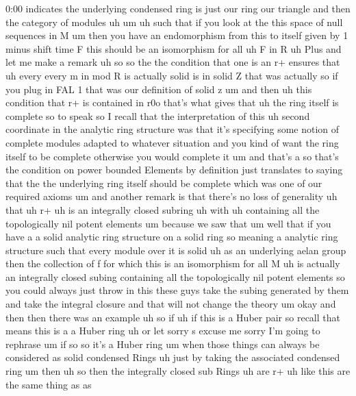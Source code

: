 \begin{unfinished}{0:00}
indicates  the  underlying  condensed  ring
is  just  our  ring  our  triangle  and  then
the  category  of
modules
uh
um  uh  such  that  if  you  look  at  the  this
space  of  null  sequences  in  M  um  then  you
have  an  endomorphism  from  this  to  itself
given  by  1  minus  shift  time  F  this
should  be  an  isomorphism  for  all  uh  F  in
R  uh
Plus
and  let  me  make  a  remark  uh
so  so  the  the  condition  that  one  is  an
r+  ensures
that  uh  every  every  m  in  mod  R  is
actually  solid  is  in  solid
Z  that  was  actually  so  if  you  plug  in
FAL  1  that  was  our  definition  of  solid  z
um  and  then  uh  this  condition  that  r+  is
contained  in  r0o  that's  what  gives  that
uh  the  ring  itself  is  complete  so  to
speak  so  I  recall  that  the
interpretation  of  this  uh  second
coordinate  in  the  analytic  ring
structure  was  that  it's  specifying  some
notion  of  complete  modules  adapted  to
whatever  situation  and  you  kind  of  want
the  ring  itself  to  be  complete  otherwise
you  would  complete  it  um  and  that's  a  so
that's  the  condition  on  power  bounded
Elements  by  definition  just  translates
to  saying  that  the  the  underlying  ring
itself  should  be  complete  which  was  one
of  our  required
axioms  um  and  another  remark  is  that
there's  no  loss  of
generality
uh  that  uh
r+  uh  is  an  integrally  closed
subring
uh  with  uh  containing  all  the
topologically  nil  potent
elements
um  because  we  saw  that
um  well  that  if  you  have  a  a  solid
analytic  ring  structure  on  a  solid  ring
so  meaning  a  analytic  ring  structure
such  that  every  module  over  it  is  solid
uh  as  an  underlying  aelan  group  then  the
collection  of  f  for  which  this  is  an
isomorphism  for  all  M  uh  is  actually  an
integrally  closed  subing  containing  all
the  topologically  nil  potent  elements  so
you  could  always  just  throw  in  this
these  guys  take  the  subing  generated  by
them  and  take  the  integral  closure  and
that  will  not  change  the
theory
um
okay  and  then  then  there  was  an  example
uh  so  if
uh  if  this  is  a  Huber
pair  so  recall  that  means  this  is  a  a
Huber
ring  uh  or  let  sorry  s  excuse  me  sorry
I'm  going  to  rephrase  um
if
so  so  it's  a  Huber  ring  um  when  those
things  can  always  be  considered  as  solid
condensed  Rings  uh  just  by  taking  the
associated  condensed  ring  um
then  uh  so  then  the  integrally
closed  sub
Rings
uh  are
r+  uh  like  this  are  the  same  thing
as  as

\end{unfinished}
